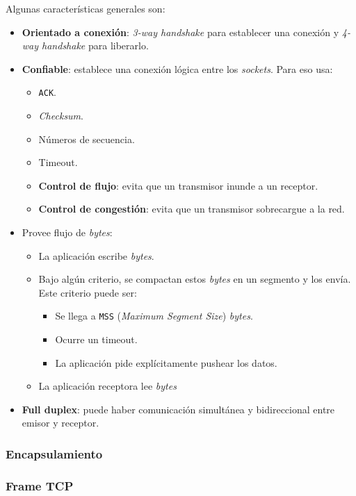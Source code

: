 \documentclass[]{article}
\begin{document}
Algunas características generales son:
\begin{itemize}
    \item \textbf{Orientado a conexión}: \emph{3-way handshake} para establecer una conexión y \emph{4-way handshake} para liberarlo.
    \item \textbf{Confiable}: establece una conexión lógica entre los \emph{sockets}. Para eso usa:
    \begin{itemize}
        \item \texttt{ACK}.
        \item \emph{Checksum}.
        \item Números de secuencia.
        \item Timeout.
        \item \textbf{Control de flujo}: evita que un transmisor inunde a un receptor.
        \item \textbf{Control de congestión}: evita que un transmisor sobrecargue a la red.
    \end{itemize}
    \item Provee flujo de \emph{bytes}:
    \begin{itemize}
         \item La aplicación escribe \emph{bytes}.
         \item Bajo algún criterio, se compactan estos \emph{bytes} en un segmento y los envía. Este criterio puede ser:
         \begin{itemize}
             \item Se llega a \texttt{MSS} (\emph{Maximum Segment Size}) \emph{bytes}.
             \item Ocurre un timeout.
             \item La aplicación pide explícitamente pushear los datos.
         \end{itemize}
         \item La aplicación receptora lee \emph{bytes}
     \end{itemize}
    \item \textbf{Full duplex}: puede haber comunicación simultánea y bidireccional entre emisor y receptor.
\end{itemize}

\subsubsection{Encapsulamiento}

\subsubsection{Frame TCP}
\end{document}
